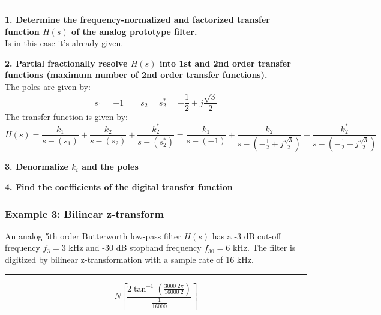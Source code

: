 \rule{\textwidth}{0.5pt}

\textbf{1. Determine the frequency-normalized and factorized transfer function $H(s)$ of the analog prototype filter.}\\
Is in this case it's already given.

\textbf{2. Partial fractionally resolve $H(s)$ into 1st and 2nd order transfer functions (maximum number of 2nd order transfer functions).}\\
The poles are given by:
$$s_1=-1 \qquad s_2=s_2^*=-\frac{1}{2}+j\frac{\sqrt{3}}{2}$$
The transfer function is given by:
$$H(s)=\frac{k_1}{s-(s_1)}+\frac{k_2}{s-(s_2)}+\frac{k_2^*}{s-(s_2^*)}=\frac{k_1}{s-(-1)}+\frac{k_2}{s-(-\frac{1}{2}+j\frac{\sqrt{3}}{2})}+\frac{k_2^*}{s-(-\frac{1}{2}-j\frac{\sqrt{3}}{2})}$$


\textbf{3. Denormalize $k_i$ and the poles}

\textbf{4. Find the coefficients of the digital transfer function}
\subsubsection{Example 3: Bilinear z-transform}
An analog 5th order Butterworth low-pass filter $H(s)$ has a -3 dB cut-off frequency $f_3= 3$ kHz and -30 dB stopband frequency $f_{30}= 6$ kHz. 
The filter is digitized by bilinear z-transformation with a sample rate of 16 kHz. 

\rule{\textwidth}{0.5pt}

$$N\left[\frac{2 \tan ^{-1}\left(\frac{3000\ 2 \pi }{16000\ 2}\right)}{\frac{1}{16000}}\right]$$
